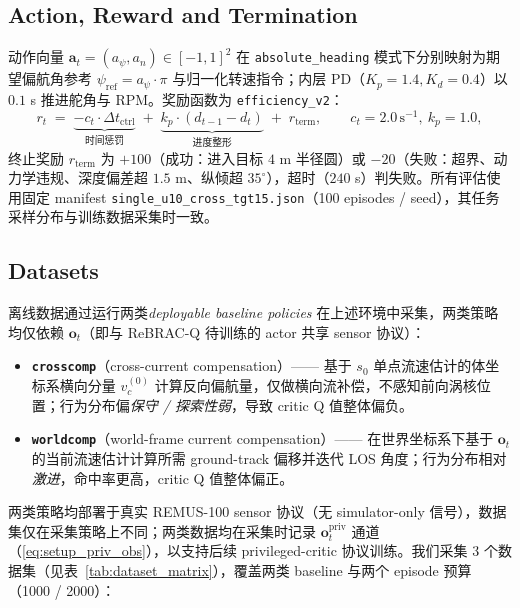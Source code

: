 \subsection{Action, Reward and Termination}\label{subsec:setup_reward}

动作向量 $\mathbf{a}_t = (a_\psi, a_n) \in [-1, 1]^2$ 在 \texttt{absolute\_heading} 模式下分别映射为期望偏航角参考 $\psi_{\mathrm{ref}} = a_\psi \cdot \pi$ 与归一化转速指令；内层 PD（$K_p = 1.4, K_d = 0.4$）以 $0.1$ s 推进舵角与 RPM。奖励函数为 \texttt{efficiency\_v2}：
\begin{equation}
r_t \;=\; \underbrace{-c_t \cdot \Delta t_{\mathrm{ctrl}}}_{\text{时间惩罚}}
       \;+\; \underbrace{k_p \cdot (d_{t-1} - d_t)}_{\text{进度整形}}
       \;+\; r_{\mathrm{term}},
\qquad c_t = 2.0\,\mathrm{s}^{-1},\ k_p = 1.0,
\label{eq:setup_reward}
\end{equation}
终止奖励 $r_{\mathrm{term}}$ 为 $+100$（成功：进入目标 $4$ m 半径圆）或 $-20$（失败：超界、动力学违规、深度偏差超 $1.5$ m、纵倾超 $35^\circ$），超时（$240$ s）判失败。所有评估使用固定 manifest \texttt{single\_u10\_cross\_tgt15.json}（100 episodes / seed），其任务采样分布与训练数据采集时一致。

\subsection{Datasets}\label{subsec:setup_datasets}

离线数据通过运行两类\emph{deployable baseline policies} 在上述环境中采集，两类策略均仅依赖 $\mathbf{o}_t$（即与 ReBRAC-Q 待训练的 actor 共享 sensor 协议）：
\begin{itemize}
    \item \textbf{\texttt{crosscomp}}（cross-current compensation）—— 基于 $s_0$ 单点流速估计的体坐标系横向分量 $v_c^{(0)}$ 计算反向偏航量，仅做横向流补偿，不感知前向涡核位置；行为分布偏\emph{保守 / 探索性弱}，导致 critic Q 值整体偏负。
    \item \textbf{\texttt{worldcomp}}（world-frame current compensation）—— 在世界坐标系下基于 $\mathbf{o}_t$ 的当前流速估计计算所需 ground-track 偏移并迭代 LOS 角度；行为分布相对\emph{激进}，命中率更高，critic Q 值整体偏正。
\end{itemize}
两类策略均部署于真实 REMUS-100 sensor 协议（无 simulator-only 信号），数据集仅在采集策略上不同；两类数据均在采集时记录 $\mathbf{o}_t^{\mathrm{priv}}$ 通道（\eqref{eq:setup_priv_obs}），以支持后续 privileged-critic 协议训练。我们采集 3 个数据集（见表~\ref{tab:dataset_matrix}），覆盖两类 baseline 与两个 episode 预算（1000 / 2000）：

